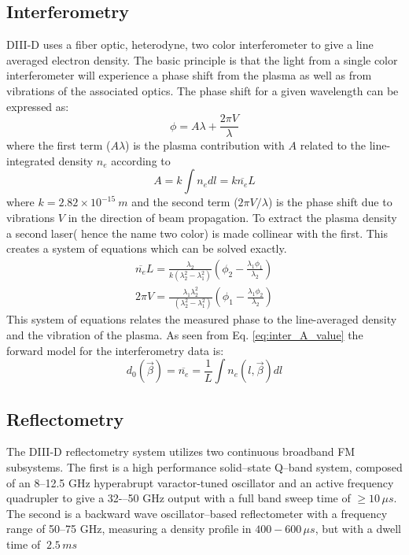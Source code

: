 \documentclass[12pt]{article}
\numberwithin{equation}{section}
\begin{document}
\subsection{Interferometry}
DIII-D uses a fiber optic, heterodyne, two color interferometer to give a line averaged electron density.\cite{van2006fiber} The basic principle is that the light from a single color interferometer will experience a phase shift from the plasma as well as from vibrations of the associated optics. The phase shift for a given wavelength can be expressed as:
\begin{equation} \label{eq:inter_phase}
	\phi = A \lambda + \frac{2\pi V}{\lambda}
\end{equation}
where the first term ($A\lambda$) is the plasma contribution with $A$ related to the line-integrated density $n_e$ according to
\begin{equation} \label{eq:inter_A_value}
	A = k \int n_e dl = k\overline{n_e}L
\end{equation}
where $k=2.82 \times 10^{-15} \:m$ and the second term ($2\pi V/\lambda$) is the phase shift due to vibrations $V$ in the direction of beam propagation. To extract the plasma density a second laser( hence the name two color) is made collinear with the first. This creates a system of equations which can be solved exactly.
\begin{align} \label{eq:inter_system}
	\overline{n_e} L = \frac{\lambda_2}{k(\lambda_2^2 - \lambda_1^2)}\left( \phi_2 - \frac{\lambda_1 \phi_1}{\lambda_2}\right) \\ 
	2\pi V = \frac{\lambda_1 \lambda_2^2}{\:\:\,(\lambda_2^2 - \lambda_1^2)}\left( \phi_1 - \frac{\lambda_1 \phi_2}{\lambda_2}\right)
\end{align}
This system of equations relates the measured phase to the line-averaged density and the vibration of the plasma. As seen from Eq. \ref{eq:inter_A_value} the forward model for the interferometry data is:
\begin{equation} \label{eq:inter_model}
	d_0(\vec{\beta})=\overline{n_e} = \frac{1}{L} \int n_e(l,\vec{\beta}) dl
\end{equation}

\subsection{Reflectometry}

The DIII-D reflectometry system utilizes two continuous broadband FM subsystems. The first is a high performance solid--state Q--band system, composed of an 8--12.5 GHz hyperabrupt varactor-tuned oscillator and an active frequency quadrupler to give a 32-–50 GHz output with a full band sweep time of $\ge 10 \,\mu s$. The second is a backward wave oscillator--based reflectometer with a frequency range of 50--75 GHz, measuring a density profile in $400-600 \,\mu s$, but with a dwell time of $~2.5 \,ms$ \cite{wang2003improved} \cite{zeng2001implementation}
\end{document}
